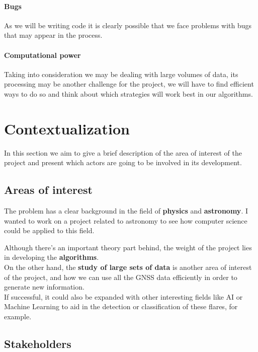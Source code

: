 \paragraph{Bugs}

As we will be writing code it is clearly possible that we face problems with bugs that may appear in the process.

\paragraph{Computational power}

Taking into consideration we may be dealing with large volumes of data, its processing may be another challenge for the project, we will have to find efficient ways to do so and think about which strategies will work best in our algorithms.

\newpage
\section{Contextualization}

In this section we aim to give a brief description of the area of interest of the project and present which actors are going to be involved in its development.

\subsection{Areas of interest}

The problem has a clear background in the field of \textbf{physics} and \textbf{astronomy}. I wanted to work on a project related to astronomy to see how computer science could be applied to this field. 

Although there’s an important theory part behind, the weight of the project lies in developing the \textbf{algorithms}.\\

On the other hand, the \textbf{study of large sets of data} is another area of interest of the project, and how we can use all the GNSS data efficiently in order to generate new information.\\

If successful, it could also be expanded with other interesting fields like AI or Machine Learning to aid in the detection or classification of these flares, for example.

\subsection{Stakeholders}

